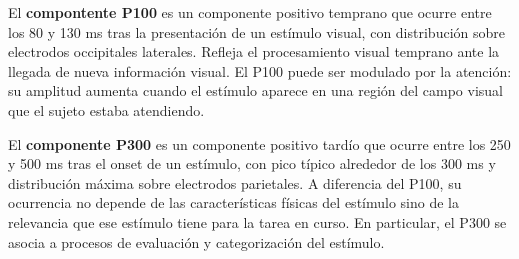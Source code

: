 El \textbf{compontente P100} es un componente positivo temprano
que ocurre entre los 80 y 130 ms tras la presentación de un
estímulo visual, con distribución sobre electrodos occipitales
laterales. Refleja el procesamiento visual temprano ante la llegada de nueva información visual. El P100 puede ser modulado por la atención: su amplitud aumenta cuando el estímulo aparece en una región del
campo visual que el sujeto estaba atendiendo.

El \textbf{componente P300} es un componente positivo tardío que ocurre entre los
250 y 500 ms tras el onset de un estímulo, con pico típico
alrededor de los 300 ms y distribución máxima sobre electrodos
parietales. A diferencia del P100, su ocurrencia no depende de las características físicas del
estímulo sino de la relevancia que ese estímulo tiene para
la tarea en curso. En particular, el P300 se asocia a procesos
de evaluación y categorización del estímulo.

